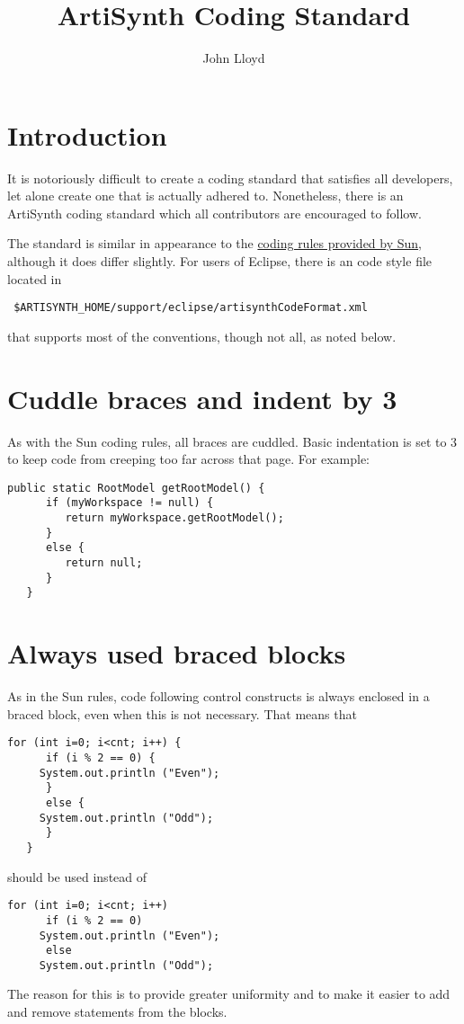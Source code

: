 \documentclass{article}
\title{ArtiSynth Coding Standard}
\author{John Lloyd}
\date{}
\begin{document}
\maketitle

\iflatexml{\large\pubdate}\fi

\tableofcontents

\section{Introduction}

It is notoriously difficult to create a coding standard that satisfies
all developers, let alone create one that is actually adhered to.
Nonetheless, there is an ArtiSynth coding standard which all
contributors are encouraged to follow.

The standard is similar in appearance to the
\href{http://java.sun.com/docs/codeconv}{coding rules provided by Sun},
although it does differ slightly. For users of Eclipse, there is an code
style file located in 
\begin{verbatim}
 $ARTISYNTH_HOME/support/eclipse/artisynthCodeFormat.xml
\end{verbatim}
that supports most of the conventions, though not all, as noted
below.

\section{Cuddle braces and indent by 3}

As with the Sun coding rules, all braces are cuddled. Basic indentation
is set to 3 to keep code from creeping too far across that page.
For example:
%
\begin{lstlisting}[]
   public static RootModel getRootModel() {
      if (myWorkspace != null) {
         return myWorkspace.getRootModel();
      }
      else {
         return null;
      }
   }
\end{lstlisting}

\section{Always used braced blocks}

As in the Sun rules, code following control constructs is always
enclosed in a braced block, even when this is not necessary. That
means that
%
\begin{lstlisting}[]
   for (int i=0; i<cnt; i++) {
      if (i % 2 == 0) {
	 System.out.println ("Even");
      }
      else {
	 System.out.println ("Odd");
      }
   }
\end{lstlisting}
should be used instead of
\begin{lstlisting}[]
   for (int i=0; i<cnt; i++)
      if (i % 2 == 0)
	 System.out.println ("Even");
      else
	 System.out.println ("Odd");
\end{lstlisting}
The reason for this is to provide greater uniformity and to
make it easier to add and remove statements from the blocks.
\end{document}
